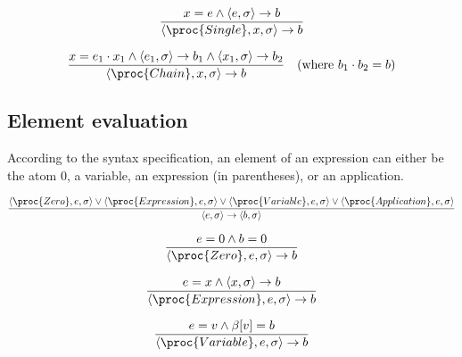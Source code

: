 \begin{equation}
{\displaystyle
  x = e
\wedge
  \left\langle e,\sigma\right\rangle
  \rightarrow
  b
\over\displaystyle
  \left\langle \proc{Single}, x,\sigma\right\rangle
  \rightarrow
  b
}
\end{equation}

\begin{equation}
{\displaystyle
  x = e_1\cdot x_1
\wedge
  \left\langle e_1,\sigma\right\rangle
  \rightarrow
  b_1
\wedge
  \left\langle x_1,\sigma\right\rangle
  \rightarrow
  b_2
\over\displaystyle
  \left\langle \proc{Chain}, x, \sigma\right\rangle
  \rightarrow
  b
}
\quad(\text{where }b_1\cdot b_2=b)
\end{equation}

\subsection{Element evaluation}

According to the syntax specification, an element of an expression can either
be the atom $0$, a variable, an expression (in parentheses), or an application. 

\begin{equation}
{\displaystyle
  \left\langle \proc{Zero}, e,\sigma\right\rangle
\vee 
  \left\langle \proc{Expression}, e,\sigma\right\rangle
\vee
  \left\langle \proc{Variable}, e,\sigma\right\rangle
\vee
  \left\langle \proc{Application}, e,\sigma\right\rangle
\over\displaystyle
  \left\langle e,\sigma\right\rangle
  \rightarrow
  \left\langle b,\sigma\right\rangle
}
\end{equation}

\begin{equation}
{\displaystyle
  e = 0
\wedge
  b = 0
\over\displaystyle
  \left\langle \proc{Zero}, e,\sigma\right\rangle
  \rightarrow
  b
}
\end{equation}

\begin{equation}
{\displaystyle
  e = x
\wedge
  \left\langle x,\sigma\right\rangle
  \rightarrow
  b
\over\displaystyle
  \left\langle \proc{Expression}, e,\sigma\right\rangle
  \rightarrow
  b
}
\end{equation}

\begin{equation}
{\displaystyle
  e = v
\wedge
  \beta[v]=b
\over\displaystyle
  \left\langle \proc{Variable}, e,\sigma\right\rangle
  \rightarrow
  b
}
\end{equation}

